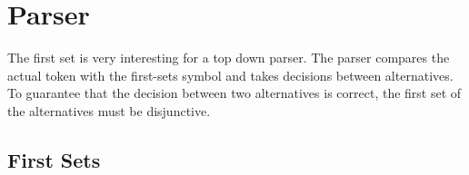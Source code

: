 \section{Parser}

The first set is very interesting for a top down parser. The parser compares the actual token with the first-sets symbol and takes decisions between alternatives. To guarantee that the decision between two alternatives is correct, the first set of the alternatives must be disjunctive. 





\subsection{First Sets}

